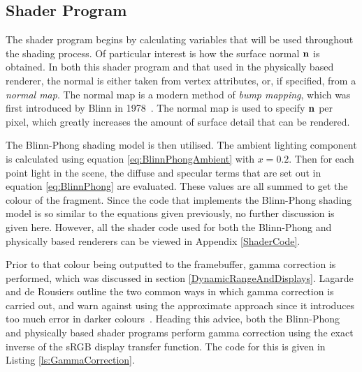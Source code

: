 \subsection{Shader Program} \label{BlinnPhongRendererShaderProgram}

The shader program begins by calculating variables that will be used throughout the shading process. Of particular interest is how the surface normal \begin{math}\mathbf{n}\end{math} is obtained. In both this shader program and that used in the physically based renderer, the normal is either taken from vertex attributes, or, if specified, from a \textit{normal map}. The normal map is a modern method of \textit{bump mapping}, which was first introduced by Blinn in 1978~\cite{BlinnBumpMapping}. The normal map is used to specify \begin{math}\mathbf{n}\end{math} per pixel, which greatly increases the amount of surface detail that can be rendered.

The Blinn-Phong shading model is then utilised. The ambient lighting component is calculated using equation \ref{eq:BlinnPhongAmbient} with \begin{math}x = 0.2\end{math}. Then for each point light in the scene, the diffuse and specular terms that are set out in equation \ref{eq:BlinnPhong} are evaluated. These values are all summed to get the colour of the fragment. Since the code that implements the Blinn-Phong shading model is so similar to the equations given previously, no further discussion is given here. However, all the shader code used for both the Blinn-Phong and physically based renderers can be viewed in Appendix \ref{ShaderCode}.

Prior to that colour being outputted to the framebuffer, gamma correction is performed, which was discussed in section \ref{DynamicRangeAndDisplays}. Lagarde and de Rousiers outline the two common ways in which gamma correction is carried out, and warn against using the approximate approach since it introduces too much error in darker colours~\cite{MovingFrostbitetoPBR}. Heading this advice, both the Blinn-Phong and physically based shader programs perform gamma correction using the exact inverse of the sRGB display transfer function. The code for this is given in Listing \ref{ls:GammaCorrection}.

